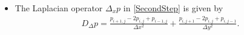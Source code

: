 \documentclass[final,11pt]{siamart251216}
\numberwithin{equation}{section}
\theoremstyle{definition}
\theoremstyle{remark}
\begin{document}
\begin{itemize}
	\begin{equation}
\label{eq:central_diff_split}
\begin{split}
D_{0} \cdot \langle \mathcal{B}(v) g \rangle = \, &\frac{1}{2\Delta x} (\langle \mathcal{B}(v) g \rangle_{i+1,j} - \langle \mathcal{B}(v) g \rangle_{i-1,j}) \\
&+ \frac{1}{2\Delta y} (\langle \mathcal{B}(v) g \rangle_{i,j+1} - \langle \mathcal{B}(v) g \rangle_{i,j-1}).
\end{split}
\end{equation}
	\item 	The Laplacian operator $\Delta_x p$ in \eqref{SecondStep} is given by
	\begin{align}
		D_{\Delta} p = \frac{p_{i+1,j} - 2p_{i,j}+ p_{i-1,j}}{\Delta x^2} + 
		\frac{p_{i,j+1} - 2p_{i,j}+ p_{i,j-1}}{\Delta y^2}.
	\end{align}
\end{itemize}
\end{document}
